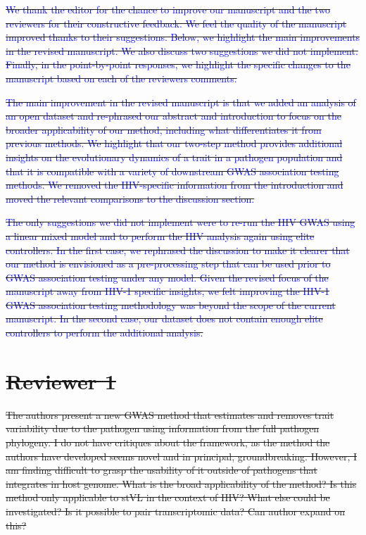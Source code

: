 \documentclass[12pt]{article} %
\providecommand{\DIFdel}[1]{{\protect\color{red}\sout{#1}}}                      %
\begin{document}
\DIFdel{\textcolor{blue}{We thank the editor for the chance to improve our manuscript and the two reviewers for their constructive feedback. We feel the quality of the manuscript improved thanks to their suggestions. Below, we highlight the main improvements in the revised manuscript. We also discuss two suggestions we did not implement. Finally, in the point-by-point responses, we highlight the specific changes to the manuscript based on each of the reviewers comments.}
}%

\DIFdel{\textcolor{blue}{The main improvement in the revised manuscript is that we added an analysis of an open dataset and re-phrased our abstract and introduction to focus on the broader applicability of our method, including what differentiates it from previous methods. We highlight that our two-step method provides additional insights on the evolutionary dynamics of a trait in a pathogen population and that it is compatible with a variety of downstream GWAS association testing methods. We removed the HIV-specific information from the introduction and moved the relevant comparisons to the discussion section.}
}%

\DIFdel{\textcolor{blue}{The only suggestions we did not implement were to re-run the HIV GWAS using a linear mixed model and to perform the HIV analysis again using elite controllers. In the first case, we rephrased the discussion to make it clearer that our method is envisioned as a pre-processing step that can be used prior to GWAS association testing under any model. Given the revised focus of the manuscript away from HIV-1 specific insights, we felt improving the HIV-1 GWAS association testing methodology was beyond the scope of the current manuscript. In the second case, our dataset does not contain enough elite controllers to perform the additional analysis.}
}%

\section*{\DIFdel{Reviewer 1}}

\DIFdel{The authors present a new GWAS method that estimates and removes trait variability due to the pathogen using information from the full pathogen phylogeny. I do not have critiques about the framework, as the method the authors have developed seems novel and in principal, groundbreaking. However, I am finding difficult to grasp the usability of it outside of pathogens that integrates in host genome. What is the broad applicability of the method? Is this method only applicable to stVL in the context of HIV? What else could be investigated? Is it possible to pair transcriptomic data? Can author expand on this?
}%
\end{document}
